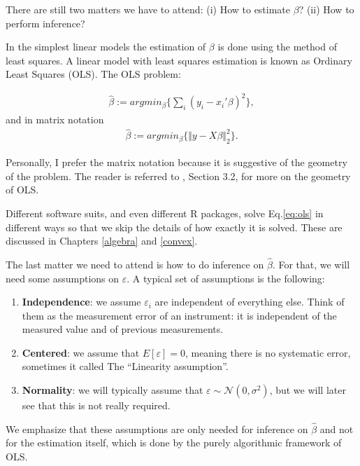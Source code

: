 \documentclass[]{book}
\providecommand{\tightlist}{%
  \setlength{\itemsep}{0pt}\setlength{\parskip}{0pt}}
\theoremstyle{definition}
\theoremstyle{definition}
\theoremstyle{definition}
\theoremstyle{remark}
\let\BeginKnitrBlock\begin \let\EndKnitrBlock\end
\begin{document}
There are still two matters we have to attend:
(i) How to estimate \(\beta\)?
(ii) How to perform inference?

In the simplest linear models the estimation of \(\beta\) is done using the method of least squares. A linear model with least squares estimation is known as Ordinary Least Squares (OLS).
The OLS problem:

\begin{align}
  \hat \beta:= argmin_\beta \{ \sum_i (y_i-x_i'\beta)^2 \},
  \label{eq:ols}
\end{align}
and in matrix notation
\begin{align}
  \hat \beta:= argmin_\beta \{ \Vert y-X\beta \Vert^2_2 \}.
  \label{eq:ols-matrix}
\end{align}

\BeginKnitrBlock{remark}
{}Personally, I prefer the matrix notation because it is suggestive of the geometry of the problem.
The reader is referred to \citet{friedman2001elements}, Section 3.2, for more on the geometry of OLS.
\EndKnitrBlock{remark}

Different software suits, and even different R packages, solve Eq.\eqref{eq:ols} in different ways so that we skip the details of how exactly it is solved.
These are discussed in Chapters \ref{algebra} and \ref{convex}.

The last matter we need to attend is how to do inference on \(\hat \beta\).
For that, we will need some assumptions on \(\varepsilon\).
A typical set of assumptions is the following:

\begin{enumerate}
\def\labelenumi{\arabic{enumi}.}
\tightlist
\item
  \textbf{Independence}: we assume \(\varepsilon_i\) are independent of everything else.
  Think of them as the measurement error of an instrument: it is independent of the measured value and of previous measurements.
\item
  \textbf{Centered}: we assume that \(E[\varepsilon]=0\), meaning there is no systematic error, sometimes it called The ``Linearity assumption''.
\item
  \textbf{Normality}: we will typically assume that \(\varepsilon \sim \mathcal{N}(0,\sigma^2)\), but we will later see that this is not really required.
\end{enumerate}

We emphasize that these assumptions are only needed for inference on \(\hat \beta\) and not for the estimation itself, which is done by the purely algorithmic framework of OLS.
\end{document}

